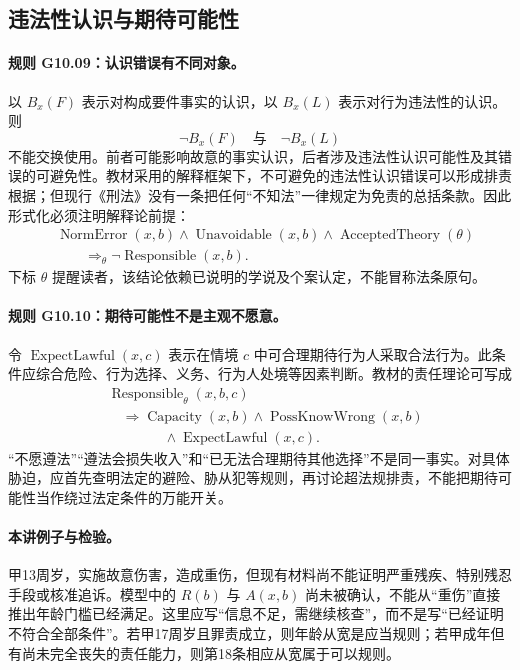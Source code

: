 \subsection{违法性认识与期待可能性}
\paragraph{规则 G10.09：认识错误有不同对象。}
以 $B_x(F)$ 表示对构成要件事实的认识，以 $B_x(L)$ 表示对行为违法性的认识。则
\[
\neg B_x(F)\quad\text{与}\quad\neg B_x(L)
\]
不能交换使用。前者可能影响故意的事实认识，后者涉及违法性认识可能性及其错误的可避免性。教材采用的解释框架下，不可避免的违法性认识错误可以形成排责根据；但现行《刑法》没有一条把任何“不知法”一律规定为免责的总括条款。因此形式化必须注明解释论前提：
\[
\begin{aligned}
&\operatorname{NormError}(x,b)\land\operatorname{Unavoidable}(x,b)
\land\operatorname{AcceptedTheory}(\theta)\\
&\qquad\Longrightarrow_{\theta}\neg\operatorname{Responsible}(x,b).
\end{aligned}
\]
下标 $\theta$ 提醒读者，该结论依赖已说明的学说及个案认定，不能冒称法条原句。

\paragraph{规则 G10.10：期待可能性不是主观不愿意。}
令 $\operatorname{ExpectLawful}(x,c)$ 表示在情境 $c$ 中可合理期待行为人采取合法行为。此条件应综合危险、行为选择、义务、行为人处境等因素判断。教材的责任理论可写成
\[
\begin{aligned}
&\operatorname{Responsible}_{\theta}(x,b,c)\\
&\quad\Longrightarrow\operatorname{Capacity}(x,b)
\land\operatorname{PossKnowWrong}(x,b)\\
&\qquad\qquad\land\operatorname{ExpectLawful}(x,c).
\end{aligned}
\]
“不愿遵法”“遵法会损失收入”和“已无法合理期待其他选择”不是同一事实。对具体胁迫，应首先查明法定的避险、胁从犯等规则，再讨论超法规排责，不能把期待可能性当作绕过法定条件的万能开关。

\paragraph{本讲例子与检验。}
甲13周岁，实施故意伤害，造成重伤，但现有材料尚不能证明严重残疾、特别残忍手段或核准追诉。模型中的 $R(b)$ 与 $A(x,b)$ 尚未被确认，不能从“重伤”直接推出年龄门槛已经满足。这里应写“信息不足，需继续核查”，而不是写“已经证明不符合全部条件”。若甲17周岁且罪责成立，则年龄从宽是应当规则；若甲成年但有尚未完全丧失的责任能力，则第18条相应从宽属于可以规则。

